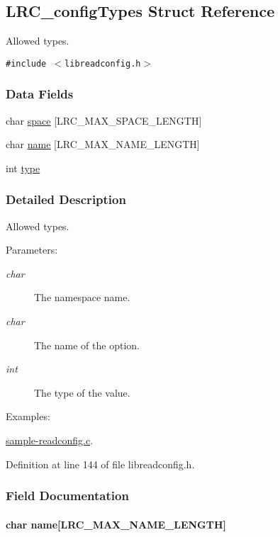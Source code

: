 \hypertarget{struct_l_r_c__config_types}{
\subsection{LRC\_\-configTypes Struct Reference}
\label{struct_l_r_c__config_types}
}
Allowed types.  


{\tt \#include $<$libreadconfig.h$>$}

\subsubsection*{Data Fields}
\begin{CompactItemize}
\item 
char \hyperlink{struct_l_r_c__config_types_4754d9e0429a1914e3617de872b4a736}{space} \mbox{[}LRC\_\-MAX\_\-SPACE\_\-LENGTH\mbox{]}
\item 
char \hyperlink{struct_l_r_c__config_types_3905a5526840a813b7d9f98268d66ec8}{name} \mbox{[}LRC\_\-MAX\_\-NAME\_\-LENGTH\mbox{]}
\item 
int \hyperlink{struct_l_r_c__config_types_c765329451135abec74c45e1897abf26}{type}
\end{CompactItemize}


\subsubsection{Detailed Description}
Allowed types. 

\begin{Desc}
\item[Parameters:]
\begin{description}
\item[{\em char}]The namespace name.\item[{\em char}]The name of the option.\item[{\em int}]The type of the value. \end{description}
\end{Desc}
\begin{Desc}
\item[Examples: ]\par


\hyperlink{sample-readconfig_8c-example}{sample-readconfig.c}.\end{Desc}


Definition at line 144 of file libreadconfig.h.

\subsubsection{Field Documentation}
\hypertarget{struct_l_r_c__config_types_3905a5526840a813b7d9f98268d66ec8}{
\paragraph[{name}]{\setlength{\rightskip}{0pt plus 5cm}char {\bf name}\mbox{[}LRC\_\-MAX\_\-NAME\_\-LENGTH\mbox{]}}\hfill}
\label{struct_l_r_c__config_types_3905a5526840a813b7d9f98268d66ec8}




